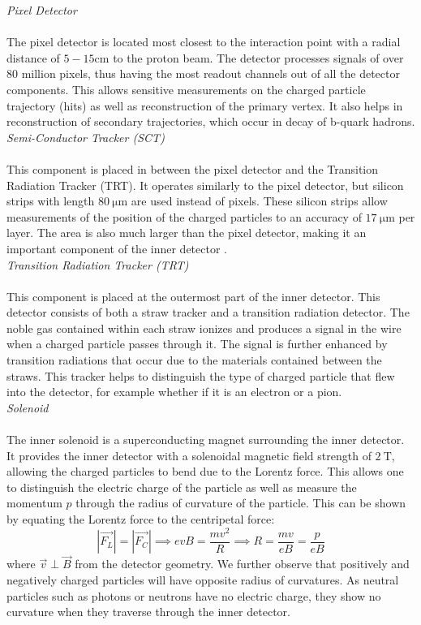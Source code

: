 \documentclass[a4paper]{report}
\numberwithin{equation}{section}
\begin{document}
\noindent \textit{Pixel Detector} \\ \\
The pixel detector is located most closest to the interaction point with a radial distance of $5 - 15$cm to the proton beam. The detector processes signals of 
over 80 million pixels, thus having the most readout channels out of all the detector components. This allows sensitive measurements on the charged particle 
trajectory (hits) as well as reconstruction of the primary vertex. It also helps in reconstruction of secondary trajectories, which occur in decay of b-quark 
hadrons. \\ 

\noindent \textit{Semi-Conductor Tracker (SCT)} \\ \\ 
This component is placed in between the pixel detector and the Transition Radiation Tracker (TRT). It operates similarly to the pixel detector, but 
silicon strips with length $\SI{80}{\micro\metre}$ are used instead of pixels. These silicon strips allow measurements of the position of the 
charged particles to an accuracy of $\SI{17}{\micro\metre}$ per layer. The area is also much larger than the pixel detector, making it an important component 
of the inner detector \cite{ATLASFactSheet}. \\ 

\noindent \textit{Transition Radiation Tracker (TRT)} \\ \\ 
This component is placed at the outermost part of the inner detector. This detector consists of both a straw tracker and a transition radiation detector. 
The noble gas contained within each straw ionizes and produces a signal in the wire when a charged particle passes through it. The signal is further enhanced 
by transition radiations that occur due to the materials contained between the straws. This tracker helps to distinguish the type of charged particle that
flew into the detector, for example whether if it is an electron or a pion. \\ 

\noindent \textit{Solenoid} \\ \\ 
The inner solenoid is a superconducting magnet surrounding the inner detector. It provides the inner detector with a solenoidal magnetic field strength of 
$\SI{2}{\tesla}$, allowing the charged particles to bend due to the Lorentz force. This allows one to distinguish the electric charge of the particle 
as well as measure the momentum $p$ through the radius of curvature of the particle. This can be shown by equating the Lorentz force to the 
centripetal force:
\begin{equation}
	|\vec{F_L}| = |\vec{F_C}| \implies evB = \frac{mv^2}{R} \implies R = \frac{mv}{eB} = \frac{p}{eB}
	\label{eq:rad_curvature}
\end{equation}
where $\vec{v} \perp \vec{B}$ from the detector geometry. We further observe that positively and negatively charged particles will have 
opposite radius of curvatures. As neutral particles such as photons or neutrons 
have no electric charge, they show no curvature when they traverse through the inner detector. 
\end{document}
